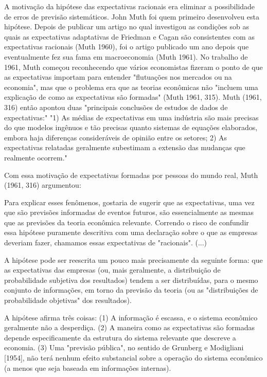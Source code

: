 \documentclass[a4paper,12pt]{article}[abntex2]
\begin{document}
A motivação da hipótese das expectativas racionais era eliminar a possibilidade de erros de previsão sistemáticos. John Muth foi quem primeiro desenvolveu esta hipótese. Depois de publicar um artigo no qual investigou as condições sob as quais as expectativas adaptativas de Friedman e Cagan são consistentes com as expectativas racionais (Muth 1960), foi o artigo publicado um ano depois que eventualmente fez sua fama em macroeconomia (Muth 1961). No trabalho de 1961, Muth começou reconhecendo que vários economistas fizeram o ponto de que as expectativas importam para entender "flutuações nos mercados ou na economia", mas que o problema era que as teorias econômicas não "incluem uma explicação de como as expectativas são formadas" (Muth 1961, 315). Muth (1961, 316) então apontou duas "principais conclusões de estudos de dados de expectativas:" "1) As médias de expectativas em uma indústria são mais precisas do que modelos ingênuos e tão precisas quanto sistemas de equações elaborados, embora haja diferenças consideráveis de opinião entre os setores; 2) As expectativas relatadas geralmente subestimam a extensão das mudanças que realmente ocorrem."

Com essa motivação de expectativas formadas por pessoas do mundo real, Muth (1961, 316) argumentou:

Para explicar esses fenômenos, gostaria de sugerir que as expectativas, uma vez que são previsões informadas de eventos futuros, são essencialmente as mesmas que as previsões da teoria econômica relevante. Correndo o risco de confundir essa hipótese puramente descritiva com uma declaração sobre o que as empresas deveriam fazer, chamamos essas expectativas de "racionais". (...)

A hipótese pode ser reescrita um pouco mais precisamente da seguinte forma: que as expectativas das empresas (ou, mais geralmente, a distribuição de probabilidade subjetiva dos resultados) tendem a ser distribuídas, para o mesmo conjunto de informações, em torno da previsão da teoria (ou as "distribuições de probabilidade objetivas" dos resultados).

A hipótese afirma três coisas: (1) A informação é escassa, e o sistema econômico geralmente não a desperdiça. (2) A maneira como as expectativas são formadas depende especificamente da estrutura do sistema relevante que descreve a economia. (3) Uma "previsão pública", no sentido de Grunberg e Modigliani [1954], não terá nenhum efeito substancial sobre a operação do sistema econômico (a menos que seja baseada em informações internas).
\end{document}
